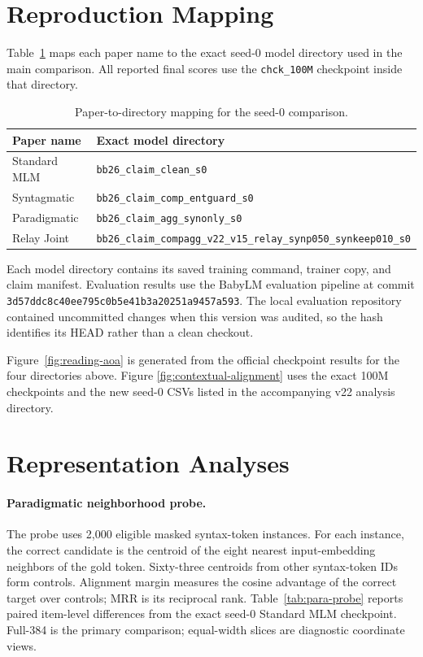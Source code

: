 \section{Reproduction Mapping}
\label{app:reproduction}

Table~\ref{tab:model-mapping} maps each paper name to the exact seed-0
model directory used in the main comparison. All reported final scores
use the \texttt{chck\_100M} checkpoint inside that directory.

\begin{table}[H]
\centering
\small
\begin{tabular}{lp{}}
\toprule
Paper name & Exact model directory \\
\midrule
Standard MLM & \texttt{bb26\_claim\_clean\_s0} \\
Syntagmatic & \texttt{bb26\_claim\_comp\_entguard\_s0} \\
Paradigmatic & \texttt{bb26\_claim\_agg\_synonly\_s0} \\
Relay Joint & \texttt{bb26\_claim\_compagg\_v22\_v15\_relay\_synp050\_synkeep010\_s0} \\
\bottomrule
\end{tabular}
\caption{Paper-to-directory mapping for the seed-0 comparison.}
\label{tab:model-mapping}
\end{table}

Each model directory contains its saved training command, trainer
copy, and claim manifest. Evaluation results use the BabyLM evaluation
pipeline at commit
\texttt{3d57ddc8c40ee795c0b5e41b3a20251a9457a593}. The local evaluation
repository contained uncommitted changes when this version was
audited, so the hash identifies its HEAD rather than a clean checkout.

Figure~\ref{fig:reading-aoa} is generated from the official checkpoint
results for the four directories above. Figure
\ref{fig:contextual-alignment} uses the exact 100M checkpoints and the
new seed-0 CSVs listed in the accompanying v22 analysis directory.

\section{Representation Analyses}
\label{app:representation-analysis}

\paragraph{Paradigmatic neighborhood probe.}
The probe uses 2,000 eligible masked syntax-token instances. For each
instance, the correct candidate is the centroid of the eight nearest
input-embedding neighbors of the gold token. Sixty-three centroids from
other syntax-token IDs form controls. Alignment margin measures the
cosine advantage of the correct target over controls; MRR is its
reciprocal rank. Table~\ref{tab:para-probe} reports paired item-level
differences from the exact seed-0 Standard MLM checkpoint. Full-384 is
the primary comparison; equal-width slices are diagnostic coordinate
views.


